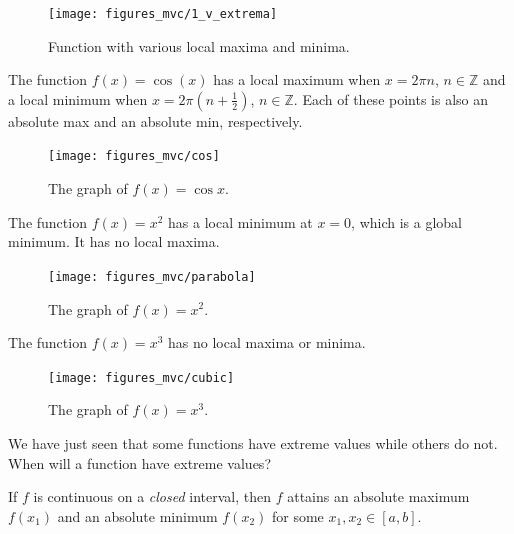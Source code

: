 \documentclass[12pt,letterpaper,reqno]{article}
\numberwithin{equation}{section}
\newcommand{\Z}{\ensuremath{\mathbb Z}}
\begin{document}
{\begin{figure}[h]
	\begin{center}
\texttt{[image: figures\_mvc/1\_v\_extrema]}
\end{center}
\caption{Function with various local maxima and minima.}
\end{figure}

\begin{example}
The function $f(x)=\cos(x)$ has a local maximum when $x=2\pi n$, $n \in \Z$ and a local minimum when $x=2 \pi(n+\frac{1}{2})$, $n \in \Z$. Each of these points is also an absolute max and an absolute min, respectively.

\begin{figure}[h]
	\begin{center}
	\texttt{[image: figures\_mvc/cos]}
\end{center}
\caption{The graph of $f(x)=\cos x$.}
\end{figure}	
\end{example}

\begin{example}
The function $f(x)=x^2$ has a local minimum at $x=0$, which is a global minimum. It has no local maxima.
\begin{figure}[h]
	\begin{center}
	\texttt{[image: figures\_mvc/parabola]}
\end{center}
\caption{The graph of $f(x)=x^2$.}
\end{figure}	
\end{example}

\begin{example}
The function $f(x)=x^3$ has no local maxima or minima.
\begin{figure}[h]
	\begin{center}
	\texttt{[image: figures\_mvc/cubic]}
\end{center}
\caption{The graph of $f(x)=x^3$.}
\end{figure}	
\end{example}

We have just seen that some functions have extreme values while others do not. When will a function have extreme values?

\begin{thm}
	If $f$ is continuous on a \emph{closed} interval, then $f$ attains an absolute maximum $f(x_1)$ and an absolute minimum $f(x_2)$ for some $x_1,x_2 \in [a,b]$.	
\end{thm}

}
\end{document}
